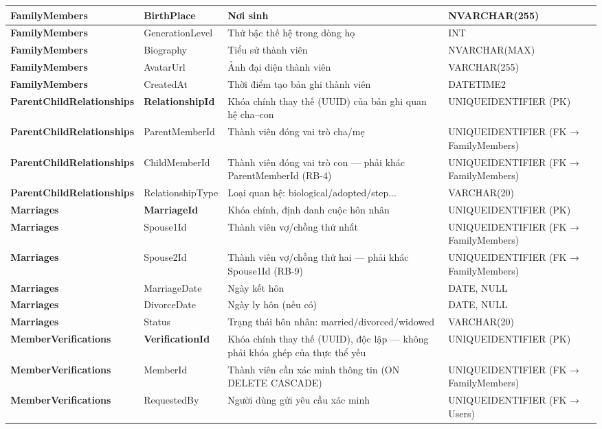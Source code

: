\begin{longtable}{|p{}|p{}|p{}|p{}|}
\textbf{FamilyMembers} & BirthPlace & Nơi sinh & NVARCHAR(255) \\ \hline
\textbf{FamilyMembers} & GenerationLevel & Thứ bậc thế hệ trong dòng họ & INT \\ \hline
\textbf{FamilyMembers} & Biography & Tiểu sử thành viên & NVARCHAR(MAX) \\ \hline
\textbf{FamilyMembers} & AvatarUrl & Ảnh đại diện thành viên & VARCHAR(255) \\ \hline
\textbf{FamilyMembers} & CreatedAt & Thời điểm tạo bản ghi thành viên & DATETIME2 \\ \hline
\textbf{ParentChildRelationships} & \textbf{RelationshipId} & Khóa chính thay thế (UUID) của bản ghi quan hệ cha–con & UNIQUEIDENTIFIER (PK) \\ \hline
\textbf{ParentChildRelationships} & ParentMemberId & Thành viên đóng vai trò cha/mẹ & UNIQUEIDENTIFIER (FK → FamilyMembers) \\ \hline
\textbf{ParentChildRelationships} & ChildMemberId & Thành viên đóng vai trò con — phải khác ParentMemberId (RB-4) & UNIQUEIDENTIFIER (FK → FamilyMembers) \\ \hline
\textbf{ParentChildRelationships} & RelationshipType & Loại quan hệ: biological/adopted/step... & VARCHAR(20) \\ \hline
\textbf{Marriages} & \textbf{MarriageId} & Khóa chính, định danh cuộc hôn nhân & UNIQUEIDENTIFIER (PK) \\ \hline
\textbf{Marriages} & Spouse1Id & Thành viên vợ/chồng thứ nhất & UNIQUEIDENTIFIER (FK → FamilyMembers) \\ \hline
\textbf{Marriages} & Spouse2Id & Thành viên vợ/chồng thứ hai — phải khác Spouse1Id (RB-9) & UNIQUEIDENTIFIER (FK → FamilyMembers) \\ \hline
\textbf{Marriages} & MarriageDate & Ngày kết hôn & DATE, NULL \\ \hline
\textbf{Marriages} & DivorceDate & Ngày ly hôn (nếu có) & DATE, NULL \\ \hline
\textbf{Marriages} & Status & Trạng thái hôn nhân: married/divorced/widowed & VARCHAR(20) \\ \hline
\textbf{MemberVerifications} & \textbf{VerificationId} & Khóa chính thay thế (UUID), độc lập — không phải khóa ghép của thực thể yếu & UNIQUEIDENTIFIER (PK) \\ \hline
\textbf{MemberVerifications} & MemberId & Thành viên cần xác minh thông tin (ON DELETE CASCADE) & UNIQUEIDENTIFIER (FK → FamilyMembers) \\ \hline
\textbf{MemberVerifications} & RequestedBy & Người dùng gửi yêu cầu xác minh & UNIQUEIDENTIFIER (FK → Users) \\ \hline

\end{longtable}
